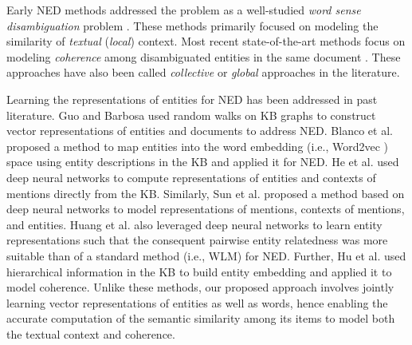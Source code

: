 \documentclass[11pt,letterpaper]{article}
\begin{document}
Early NED methods addressed the problem as a well-studied \textit{word sense disambiguation} problem \cite{Mihalcea2007}.
These methods primarily focused on modeling the similarity of \textit{textual} (\textit{local}) context.
Most recent state-of-the-art methods focus on modeling \textit{coherence} among disambiguated entities in the same document \cite{Cucerzan2007,Milne2008,Hoffart2011,Ratinov2011}.
These approaches have also been called \textit{collective} or \textit{global} approaches in the literature.

Learning the representations of entities for NED has been addressed in past literature.
Guo and Barbosa \cite{Guo2014b} used random walks on KB graphs to construct vector representations of entities and documents to address NED.
Blanco et al. \cite{Blanco2015a} proposed a method to map entities into the word embedding (i.e., Word2vec \cite{Mikolov2013a}) space using entity descriptions in the KB and applied it for NED.
He et al. \cite{he-EtAl:2013:Short} used deep neural networks to compute representations of entities and contexts of mentions directly from the KB.
Similarly, Sun et al. \cite{Sum2015} proposed a method based on deep neural networks to model representations of mentions, contexts of mentions, and entities.
Huang et al. \cite{DBLP:journals/corr/HuangHJ15} also leveraged deep neural networks to learn entity representations such that the consequent pairwise entity relatedness was more suitable than of a standard method (i.e., WLM) for NED.
Further, Hu et al. \cite{hu-EtAl:2015:ACL-IJCNLP} used hierarchical information in the KB to build entity embedding and applied it to model coherence.
Unlike these methods, our proposed approach involves jointly learning vector representations of entities as well as words, hence enabling the accurate computation of the semantic similarity among its items to model both the textual context and coherence.
\end{document}
